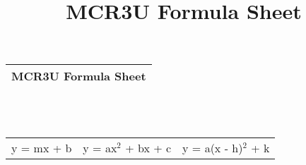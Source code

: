 \documentclass[16pt]{article}
\title{MCR3U Formula Sheet}
\begin{document}
\begin{LARGE}

\begin{Huge}
\begin{tabular}{ |l| }
  \hline
  MCR3U Formula Sheet\\
  \hline
\end{tabular}
\\
\\


\end{Huge}
\setlength{\tabcolsep}{35pt}
\begin{tabular}{l l l}


y = mx + b & y = ax$^2$ + bx + c  & y = a(x - h)$^2$ + k



\end{tabular}
\end{LARGE}
\end{document}
